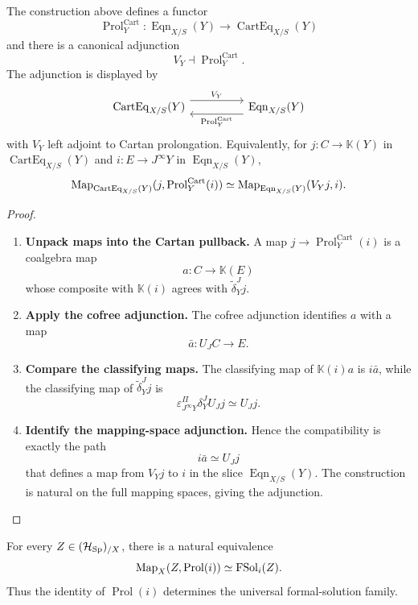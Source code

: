 \begin{theorem}
\label{thm:cartan-prolongation-adjunction}
The construction above defines a functor
\[
  \operatorname{Prol}^{\mathrm{Cart}}_Y:\operatorname{Eqn}_{X/S}(Y)\to\operatorname{CartEq}_{X/S}(Y)
\]
and there is a canonical adjunction
\[
  V_Y\dashv \operatorname{Prol}^{\mathrm{Cart}}_Y.
\]
The adjunction is displayed by
\[
\begin{tikzcd}[column sep=huge]
\operatorname{CartEq}_{X/S}(Y)
  \ar[r,shift left=1.4ex,"V_Y"]
&
\operatorname{Eqn}_{X/S}(Y)
  \ar[l,shift left=1.4ex,"\operatorname{Prol}^{\mathrm{Cart}}_Y"]
\end{tikzcd}
\]
with \(V_Y\) left adjoint to Cartan prolongation.
Equivalently, for \(j:C\to\mathbb K(Y)\) in \(\operatorname{CartEq}_{X/S}(Y)\) and
\(i:E\to J^\infty Y\) in \(\operatorname{Eqn}_{X/S}(Y)\),
\[
  \operatorname{Map}_{\operatorname{CartEq}_{X/S}(Y)}(j,\operatorname{Prol}^{\mathrm{Cart}}_Y(i))
  \simeq
  \operatorname{Map}_{\operatorname{Eqn}_{X/S}(Y)}(V_Yj,i).
\]
\end{theorem}

\begin{proof}
\leavevmode
\begin{enumerate}[label=\textup{(\arabic*)}]
    \item \textbf{Unpack maps into the Cartan pullback.}
A map \(j\to \operatorname{Prol}^{\mathrm{Cart}}_Y(i)\) is a coalgebra map
\[
  a:C\to\mathbb K(E)
\]
whose composite with \(\mathbb K(i)\) agrees with
\(\widetilde\delta^J_Yj\).

    \item \textbf{Apply the cofree adjunction.}
The cofree adjunction identifies \(a\) with a map
\[
  \bar a:U_JC\to E.
\]

    \item \textbf{Compare the classifying maps.}
The classifying map of \(\mathbb K(i)a\) is \(i\bar a\), while the classifying
map of \(\widetilde\delta^J_Yj\) is
\[
  \varepsilon^\Pi_{J^\infty Y}\delta^J_YU_Jj
  \simeq U_Jj.
\]

    \item \textbf{Identify the mapping-space adjunction.}
Hence the compatibility is exactly the path
\[
  i\bar a\simeq U_Jj
\]
that defines a map from \(V_Yj\) to \(i\) in the slice \(\operatorname{Eqn}_{X/S}(Y)\). The
construction is natural on the full mapping spaces, giving the adjunction.
\end{enumerate}
\end{proof}

\begin{theorem}
\label{thm:universal-formal-solution}
For every \(Z\in(\mathcal H_{\operatorname{Sp}})_{/X}\), there is a natural equivalence
\[
  \operatorname{Map}_X(Z,\operatorname{Prol}(i))
  \simeq
  \operatorname{FSol}_i(Z).
\]
Thus the identity of \(\operatorname{Prol}(i)\) determines the universal formal-solution
family.
\end{theorem}

